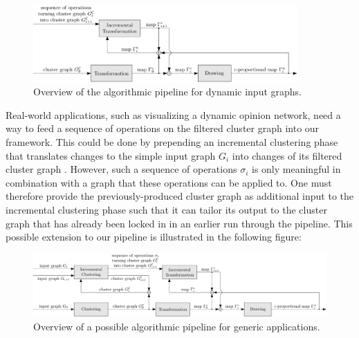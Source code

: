 \begin{figure}[H]
	\centering\includegraphics[width=0.9\textwidth]{Resources/Framework-3.pdf}
	\caption{Overview of the algorithmic pipeline for dynamic input graphs.}
	\label{fig:dynamic-pipeline-thesis}
\end{figure}

Real-world applications, such as visualizing a dynamic opinion network, need a way to feed a sequence of operations on the filtered cluster graph into our framework.
This could be done by prepending an incremental clustering phase that translates changes to the simple input graph $G_i$ into changes of its filtered cluster graph .
However, such a sequence of operations $\sigma_i$ is only meaningful in combination with a graph that these operations can be applied to.
One must therefore provide the previously-produced cluster graph  as additional input to the incremental clustering phase such that it can tailor its output to the cluster graph that has already been locked in in an earlier run through the pipeline.
This possible extension to our pipeline is illustrated in the following figure:
%
\begin{figure}[H]
	\centering\includegraphics[width=\textwidth]{Resources/Framework-4.pdf}
	\caption{Overview of a possible algorithmic pipeline for generic applications.}
	\label{fig:dynamic-pipeline-application}
\end{figure}

